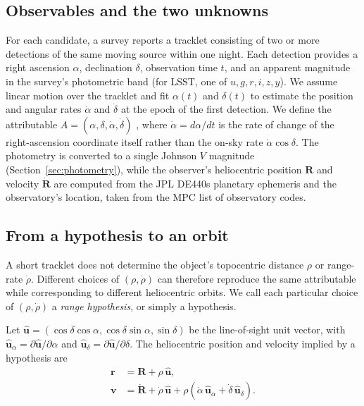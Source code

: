 \documentclass[linenumbers,twocolumn]{aastex701}
\begin{document}
\subsection{Observables and the two unknowns}
\label{sec:observables}

For each candidate, a survey reports a tracklet consisting of two or more
detections of the same moving source within one night. Each detection provides
a right ascension $\alpha$, declination $\delta$, observation time $t$, and
an apparent magnitude in the survey's photometric band (for LSST, one of
$u,g,r,i,z,y$). We assume linear motion over the tracklet and fit
$\alpha(t)$ and $\delta(t)$ to estimate the position and angular rates
$\dot\alpha$ and $\dot\delta$ at the epoch of the first detection. We define the attributable
$A=(\alpha,\delta,\dot\alpha,\dot\delta)$ \citep{milani2004}, where
$\dot\alpha=d\alpha/dt$ is the rate of change of the right-ascension
coordinate itself rather than the on-sky rate $\dot\alpha\cos\delta$.
The photometry is converted to a single Johnson $V$ magnitude
(Section~\ref{sec:photometry}), while the
observer's heliocentric position $\mathbf{R}$ and velocity
$\dot{\mathbf{R}}$ are computed from the JPL DE440s planetary ephemeris
\citep{park2021} and the observatory's location, taken from the MPC list of
observatory codes.

\subsection{From a hypothesis to an orbit}
\label{sec:geometry}

A short tracklet does not determine the object's topocentric distance
$\rho$ or range-rate $\dot\rho$. Different choices of
$(\rho,\dot\rho)$ can therefore reproduce the same attributable while
corresponding to different heliocentric orbits. We call each particular
choice of $(\rho,\dot\rho)$ a \emph{range hypothesis}, or simply a
hypothesis.

Let
$\hat{\mathbf{u}}=(\cos\delta\cos\alpha,\cos\delta\sin\alpha,\sin\delta)$
be the line-of-sight unit vector, with
$\hat{\mathbf{u}}_\alpha=\partial\hat{\mathbf{u}}/\partial\alpha$ and
$\hat{\mathbf{u}}_\delta=\partial\hat{\mathbf{u}}/\partial\delta$. The
heliocentric position and velocity implied by a hypothesis are
\begin{align}
\mathbf{r} &= \mathbf{R} + \rho\,\hat{\mathbf{u}}, \label{eq:r}\\
\mathbf{v} &= \dot{\mathbf{R}} + \dot{\rho}\,\hat{\mathbf{u}}
+ \rho\left(\dot{\alpha}\,\hat{\mathbf{u}}_\alpha +
\dot{\delta}\,\hat{\mathbf{u}}_\delta\right). \label{eq:v}
\end{align}
\end{document}
